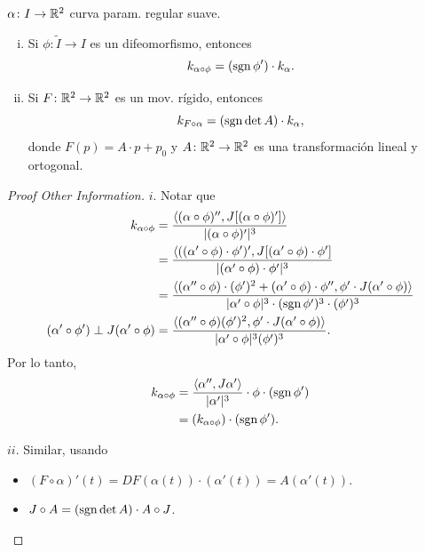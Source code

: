 \begin{prop}
	$\alpha \colon I \to \mathbb{R}^{2}$ curva param. regular suave.
	\begin{enumerate}[(i)]
		\item Si $\phi \colon \widetilde{I} \to I$ es un difeomorfismo, entonces
		\[ k_{\alpha \circ \phi} = (\operatorname{sgn} \phi') \cdot k_{\alpha}. \]

		\item Si $F \colon \mathbb{R}^{2} \to \mathbb{R}^{2}$ es un mov. rígido, entonces
		\[ k_{F \circ \alpha} = (\operatorname{sgn} \det A) \cdot k_{\alpha}, \]
		donde $F(p) = A \cdot p + p_{0}$ y $A \colon \mathbb{R}^{2} \to \mathbb{R}^{2}$ es una transformación lineal y ortogonal.
	\end{enumerate}
\end{prop}
\begin{proof}[Proof Other Information]
	$\boxed{i.}$ Notar que
	\begin{align*}
		k_{\alpha \circ \phi} &= \frac{\langle (\alpha \circ \phi)'', J[(\alpha \circ \phi)'] \rangle}{|(\alpha \circ \phi)'|^{3}} \\
		&= \frac{\langle ((\alpha' \circ \phi) \cdot \phi')', J[(\alpha' \circ \phi) \cdot \phi']}{|(\alpha' \circ \phi) \cdot \phi'|^{3}} \\
		&= \frac{\langle (\alpha'' \circ \phi) \cdot (\phi')^{2} + (\alpha' \circ \phi) \cdot \phi'', \phi' \cdot J(\alpha' \circ \phi) \rangle}{|\alpha' \circ \phi|^{3} \cdot (\operatorname{sgn} \phi')^{3} \cdot (\phi')^{3}} \\
		(\alpha' \circ \phi') \perp J(\alpha' \circ \phi) &= \frac{\langle (\alpha'' \circ \phi)(\phi')^{2}, \phi' \cdot J(\alpha' \circ \phi) \rangle}{|\alpha' \circ \phi|^{3} (\phi')^{3}}
	.\end{align*}
	Por lo tanto,
	\begin{align*}
		k_{\alpha \circ \phi} &= \frac{\langle \alpha'', J \alpha' \rangle}{|\alpha'|^{3}} \cdot \phi \cdot (\operatorname{sgn} \phi') \\
		&= (k_{\alpha \circ \phi}) \cdot (\operatorname{sgn} \phi')
	.\end{align*}
	\par $\boxed{ii.}$ Similar, usando
	\begin{itemize}
		\item $(F \circ \alpha)'(t) = DF(\alpha(t)) \cdot (\alpha'(t)) = A(\alpha'(t))$.

		\item $J \circ A = (\operatorname{sgn} \det A) \cdot A \circ J$.
	\end{itemize}
\end{proof}


